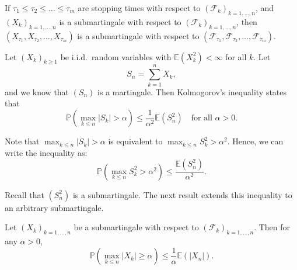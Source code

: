 If $\tau_1 \leq \tau_2 \leq \ldots \leq \tau_m$ are stopping times with respect to $(\mathcal{F}_k)_{k=1,\ldots,n}$, and $(X_k)_{k=1,\ldots,n}$ is a submartingale with respect to $(\mathcal{F}_k)_{k=1,\ldots,n}$, then $(X_{\tau_1}, X_{\tau_2}, \ldots, X_{\tau_m})$ is a submartingale with respect to $(\mathcal{F}_{\tau_1}, \mathcal{F}_{\tau_2}, \ldots, \mathcal{F}_{\tau_m})$.


\begin{theorem}
Let $(X_k)_{k \geq 1}$ be i.i.d.\ random variables with $\mathbb{E}(X_k^2) < \infty$ for all $k$. Let
\[ S_n = \sum_{k=1}^n X_k, \]
and we know that $(S_n)$ is a martingale. Then Kolmogorov's inequality states that
\[ \mathbb{P}\left( \max_{k \leq n} |S_k| > \alpha \right) \leq \frac{1}{\alpha^2} \mathbb{E}(S_n^2) \quad \text{for all } \alpha > 0. \]
\end{theorem}

Note that $\max_{k \leq n} |S_k| > \alpha$ is equivalent to $\max_{k \leq n} S_k^2 > \alpha^2$. Hence, we can write the inequality as:
\[ \mathbb{P}\left( \max_{k \leq n} S_k^2 > \alpha^2 \right) \leq \frac{\mathbb{E}(S_n^2)}{\alpha^2}. \]

Recall that $(S_n^2)$ is a submartingale. The next result extends this inequality to an arbitrary submartingale.

\begin{theorem}
Let $(X_k)_{k=1,\ldots,n}$ be a submartingale with respect to $(\mathcal{F}_k)_{k=1,\ldots,n}$. Then for any $\alpha > 0$,
\[ \mathbb{P}\left( \max_{k \leq n} |X_k| \geq \alpha \right) \leq \frac{1}{\alpha} \mathbb{E}(|X_n|). \]
\end{theorem}


